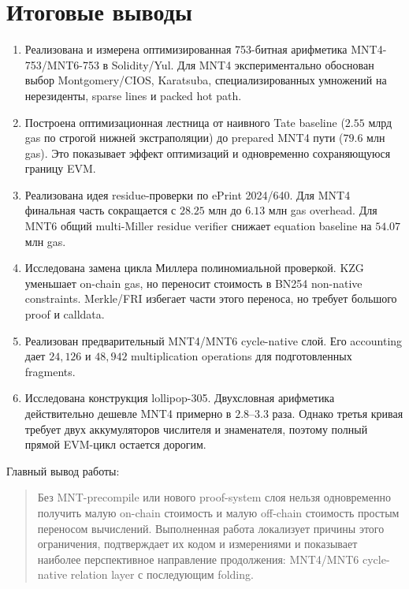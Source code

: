 \documentclass[12pt,a4paper]{article}
\begin{document}
\section{Итоговые выводы}

\begin{enumerate}
    \item Реализована и измерена оптимизированная 753-битная арифметика
    MNT4-753/MNT6-753 в Solidity/Yul. Для MNT4 экспериментально обоснован выбор
    Montgomery/CIOS, Karatsuba, специализированных умножений на нерезиденты,
    sparse lines и packed hot path.

    \item Построена оптимизационная лестница от наивного Tate baseline
    ($2.55$ млрд gas по строгой нижней экстраполяции) до prepared MNT4 пути
    ($79.6$ млн gas). Это показывает эффект оптимизаций и одновременно
    сохраняющуюся границу EVM.

    \item Реализована идея residue-проверки по ePrint 2024/640. Для MNT4
    финальная часть сокращается с $28.25$ млн до $6.13$ млн gas overhead.
    Для MNT6 общий multi-Miller residue verifier снижает equation baseline на
    $54.07$ млн gas.

    \item Исследована замена цикла Миллера полиномиальной проверкой. KZG
    уменьшает on-chain gas, но переносит стоимость в BN254 non-native
    constraints. Merkle/FRI избегает части этого переноса, но требует большого
    proof и calldata.

    \item Реализован предварительный MNT4/MNT6 cycle-native слой. Его
    accounting дает $24{,}126$ и $48{,}942$ multiplication operations для
    подготовленных fragments.

    \item Исследована конструкция lollipop-305. Двухсловная арифметика
    действительно дешевле MNT4 примерно в $2.8$--$3.3$ раза. Однако третья
    кривая требует двух аккумуляторов числителя и знаменателя, поэтому полный
    прямой EVM-цикл остается дорогим.
\end{enumerate}

Главный вывод работы:
\begin{quote}
Без MNT-precompile или нового proof-system слоя нельзя одновременно получить
малую on-chain стоимость и малую off-chain стоимость простым переносом
вычислений. Выполненная работа локализует причины этого ограничения,
подтверждает их кодом и измерениями и показывает наиболее перспективное
направление продолжения: MNT4/MNT6 cycle-native relation layer с последующим
folding.
\end{quote}
\end{document}
